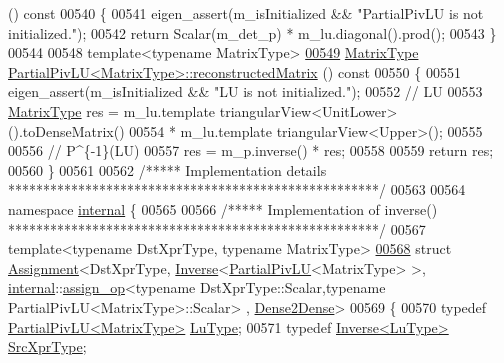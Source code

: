 \begin{DoxyCode}
      ()\textcolor{keyword}{ const}
00540 \textcolor{keyword}{}\{
00541   eigen\_assert(m\_isInitialized && \textcolor{stringliteral}{"PartialPivLU is not initialized."});
00542   \textcolor{keywordflow}{return} Scalar(m\_det\_p) * m\_lu.diagonal().prod();
00543 \}
00544 
00548 \textcolor{keyword}{template}<\textcolor{keyword}{typename} MatrixType>
\hyperlink{group___l_u___module_aba7f1ee83537b0d240ebf206503a4920}{00549} \hyperlink{group___core___module}{MatrixType} \hyperlink{group___l_u___module_class_eigen_1_1_partial_piv_l_u}{PartialPivLU<MatrixType>::reconstructedMatrix}
      ()\textcolor{keyword}{ const}
00550 \textcolor{keyword}{}\{
00551   eigen\_assert(m\_isInitialized && \textcolor{stringliteral}{"LU is not initialized."});
00552   \textcolor{comment}{// LU}
00553   \hyperlink{group___core___module}{MatrixType} res = m\_lu.template triangularView<UnitLower>().toDenseMatrix()
00554                  * m\_lu.template triangularView<Upper>();
00555 
00556   \textcolor{comment}{// P^\{-1\}(LU)}
00557   res = m\_p.inverse() * res;
00558 
00559   \textcolor{keywordflow}{return} res;
00560 \}
00561 
00562 \textcolor{comment}{/***** Implementation details *****************************************************/}
00563 
00564 \textcolor{keyword}{namespace }\hyperlink{namespaceinternal}{internal} \{
00565 
00566 \textcolor{comment}{/***** Implementation of inverse() *****************************************************/}
00567 \textcolor{keyword}{template}<\textcolor{keyword}{typename} DstXprType, \textcolor{keyword}{typename} MatrixType>
\hyperlink{struct_eigen_1_1internal_1_1_assignment_3_01_dst_xpr_type_00_01_inverse_3_01_partial_piv_l_u_3_0fe0876a690a87045a6eaca571908231d}{00568} \textcolor{keyword}{struct }\hyperlink{struct_eigen_1_1internal_1_1_assignment}{Assignment}<DstXprType, \hyperlink{class_eigen_1_1_inverse}{Inverse}<\hyperlink{group___l_u___module_class_eigen_1_1_partial_piv_l_u}{PartialPivLU}<MatrixType> >, 
      \hyperlink{namespaceinternal}{internal}::\hyperlink{struct_eigen_1_1internal_1_1assign__op}{assign\_op}<typename DstXprType::Scalar,typename PartialPivLU<MatrixType>::Scalar>
      , \hyperlink{struct_eigen_1_1internal_1_1_dense2_dense}{Dense2Dense}>
00569 \{
00570   \textcolor{keyword}{typedef} \hyperlink{group___l_u___module_class_eigen_1_1_partial_piv_l_u}{PartialPivLU<MatrixType>} \hyperlink{group___l_u___module_class_eigen_1_1_partial_piv_l_u}{LuType};
00571   \textcolor{keyword}{typedef} \hyperlink{class_eigen_1_1_inverse}{Inverse<LuType>} \hyperlink{class_eigen_1_1_inverse}{SrcXprType};

\end{DoxyCode}
